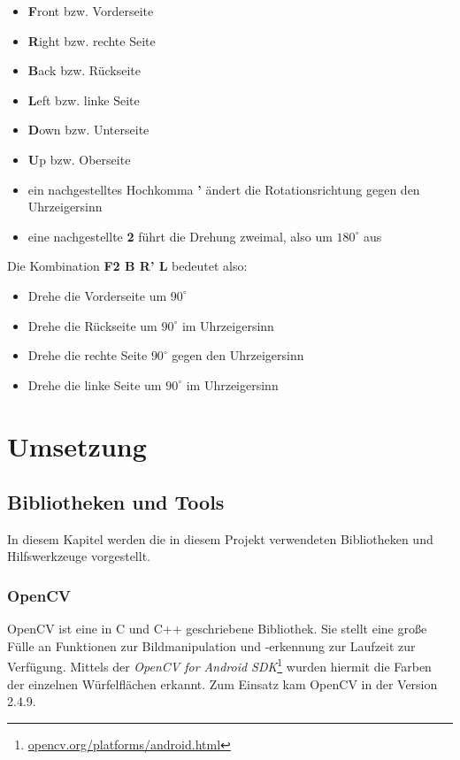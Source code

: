 \begin{itemize}
  \item \textbf{F}ront bzw. Vorderseite
  \item \textbf{R}ight bzw. rechte Seite
  \item \textbf{B}ack bzw. Rückseite
  \item \textbf{L}eft bzw. linke Seite
  \item \textbf{D}own bzw. Unterseite
  \item \textbf{U}p bzw. Oberseite
  \item ein nachgestelltes Hochkomma \textbf{'} ändert die Rotationsrichtung gegen den
    Uhrzeigersinn
  \item eine nachgestellte \textbf{2} führt die Drehung zweimal, also um
    $180^\circ$ aus
\end{itemize}

Die Kombination \textbf{F2 B R' L} bedeutet also:
\begin{itemize}
  \item Drehe die Vorderseite um $90^\circ$
  \item Drehe die Rückseite um $90^\circ$ im Uhrzeigersinn
  \item Drehe die rechte Seite $90^\circ$ gegen den Uhrzeigersinn
  \item Drehe die linke Seite um $90^\circ$ im Uhrzeigersinn
\end{itemize}


\section{Umsetzung}  %

\subsection{Bibliotheken und Tools}  %
In diesem Kapitel werden die in diesem Projekt verwendeten Bibliotheken und
Hilfswerkzeuge vorgestellt.

\subsubsection{OpenCV}  %

OpenCV ist eine in C und C++ geschriebene Bibliothek. Sie stellt eine große
Fülle an Funktionen zur Bildmanipulation und -erkennung zur Laufzeit zur
Verfügung. Mittels der \emph{OpenCV for Android
SDK}\footnote{\url{opencv.org/platforms/android.html}} wurden hiermit die Farben
der einzelnen Würfelflächen erkannt. Zum Einsatz kam OpenCV in der Version 2.4.9.

